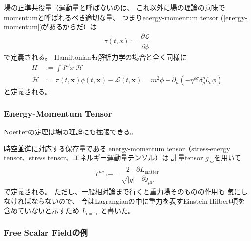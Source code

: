 場の正準共役量（運動量と呼ばないのは、
これ以外に場の理論の意味でmomentumと呼ばれるべき適切な量、
つまりenergy-momentum tensor (\ref{energy-momentum})があるからだ）は
\begin{align}
    \pi(t, x) := \dfrac{\partial \mathcal{L}}{\partial \dot{\phi}}
\end{align}
で定義される。
Hamiltonianも解析力学の場合と全く同様に
\begin{subequations}
\begin{align}
    H
    &:=
    \int d^D x\ \mathcal{H}
\\
    \mathcal{H}
    &:=
    \pi(t, \bm{x}) \dot{\phi}(t, \bm{x})
    -
    \mathcal{L}(t, \bm{x})
    =
    m^2 \phi
    -
    \partial_\mu
    \left(
        - \eta^{\rho \sigma}
        \delta_\rho^\mu
        \partial_\sigma \phi
    \right)
\end{align}
\end{subequations}
と定義される。

\subsubsection{Energy-Momentum Tensor}

Noetherの定理は場の理論にも拡張できる。

時空並進に対応する保存量である
energy-momentum tensor（stress-energy tensor、stress tensor、エネルギー運動量テンソル）は
計量tensor $g_{\mu\nu}$を用いて
\begin{align}
    T^{\mu\nu}
    :=
    -
    \dfrac{2}{\sqrt{|g|} }
    \dfrac{\partial L_{\mathrm{matter}}}{\partial g_{\mu\nu}}
\label{energy-momentum}
\end{align}
で定義される。
ただし、一般相対論まで行くと重力場そのものの作用も
気にしなければならないので、
今はLagrangianの中に重力を表すEinstein-Hilbert項を含めていないと示すため
$L_{\mathrm{matter}}$と書いた。

\subsubsection{Free Scalar Fieldの例}

